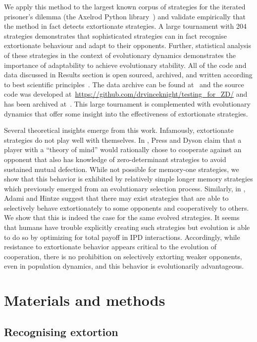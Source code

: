 \documentclass[10pt,letterpaper]{article}
\begin{document}
We apply this method to the largest known corpus of strategies for the iterated
prisoner's dilemma (the Axelrod Python library~\cite{Knight2016, Knight2018})
and validate empirically that the method in fact detects extortionate strategies.
A large tournament with 204 strategies demonstrates that sophisticated
strategies can in fact recognise extortionate behaviour and adapt to their
opponents. Further, statistical analysis of these strategies in the context of
evolutionary dynamics demonstrates the importance of adaptability to achieve
evolutionary stability. All of the code and data discussed in
Results section is open sourced, archived, and written
according to best scientific principles~\cite{Wilson2014}. The data archive can
be found at~\cite{vincent_knight_2018_1297075} and the source code was developed
at~\url{https://github.com/drvinceknight/testing_for_ZD/} and has been archived
at~\cite{vincent_knight_2019_2598534}. This large tournament is complemented
with evolutionary dynamics that offer some insight into the
effectiveness of extortionate strategies.

Several theoretical insights emerge from this work. Infamously, extortionate
strategies do not play well with themselves. In \cite{Press2012},
Press and Dyson claim that a player with a ``theory of mind'' would
rationally chose to cooperate against an opponent that also has knowledge
of zero-determinant strategies to avoid sustained mutual defection. While not
possible for memory-one strategies, we show that this behavior is exhibited by
relatively simple longer memory strategies which previously emerged from an
evolutionary selection process. Similarly, in
\cite{adami2013evolutionary}, Adami and Hintze suggest that there may exist
strategies that are able to selectively behave extortionately to some opponents
and cooperatively to others. We show that this is indeed the case for the same
evolved strategies. It seems that humans have trouble explicitly creating such
strategies but evolution is able to do so by optimizing for total payoff in IPD
interactions. Accordingly, while resistance to extortionate behavior appears
critical to the evolution of cooperation, there is no prohibition on selectively
extorting weaker opponents, even in population dynamics, and this behavior is
evolutionarily advantageous.

\section*{Materials and methods}
\subsection*{Recognising extortion}
\end{document}
